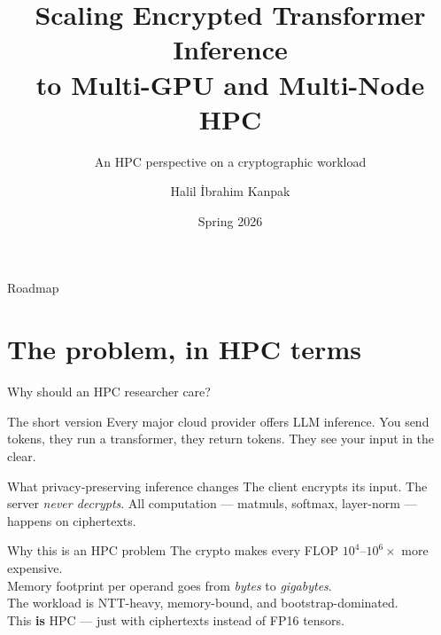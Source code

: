 \documentclass[aspectratio=169]{beamer}
\title{Scaling Encrypted Transformer Inference\\to Multi-GPU and Multi-Node HPC}
\subtitle{An HPC perspective on a cryptographic workload}
\author{Halil İbrahim Kanpak}
\institute{Koç University — Comp390 Independent Study\\[0.3em]Advisor: Prof.\ Didem Unat}
\date{Spring 2026}
\begin{document}
\begin{frame}[plain]
  \titlepage
\end{frame}

\begin{frame}{Roadmap}
  \tableofcontents[hideallsubsections]
\end{frame}

\section{The problem, in HPC terms}

\begin{frame}{Why should an HPC researcher care?}
  \begin{block}{The short version}
    Every major cloud provider offers LLM inference. You send tokens, they run a
    transformer, they return tokens. \alert{They see your input in the clear.}
  \end{block}
  \pause
  \begin{block}{What privacy-preserving inference changes}
    The client encrypts its input. The server \emph{never decrypts}.
    All computation — matmuls, softmax, layer-norm — happens on ciphertexts.
  \end{block}
  \pause
  \begin{alertblock}{Why this is an HPC problem}
    The crypto makes every FLOP $10^4$–$10^6\times$ more expensive.\\
    Memory footprint per operand goes from \emph{bytes} to \emph{gigabytes}.\\
    The workload is NTT-heavy, memory-bound, and bootstrap-dominated.\\
    This \textbf{is} HPC — just with ciphertexts instead of FP16 tensors.
  \end{alertblock}
\end{frame}
\end{document}
